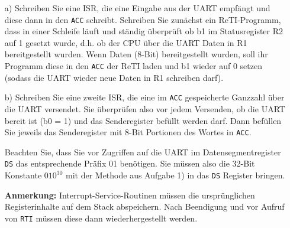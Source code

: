 \documentclass{article}
\begin{document}
\begin{itemize}
\item[a)]
Schreiben Sie eine ISR, die eine Eingabe aus der UART empfängt
und diese dann in den \texttt{ACC} schreibt.
Schreiben Sie zunächst ein ReTI-Programm, dass in einer Schleife läuft und ständig überprüft ob b1
im Statusregister R2 auf 1 gesetzt wurde, d.h. ob der CPU über die UART Daten in R1 bereitgestellt wurden.
Wenn Daten (8-Bit) bereitgestellt wurden, soll ihr Programm diese in den \texttt{ACC} der ReTI laden
und b1 wieder auf 0 setzen (sodass die UART wieder neue Daten in R1 schreiben darf).

\item[b)]
Schreiben Sie eine zweite ISR, die eine im \texttt{ACC} gespeicherte Ganzzahl über die UART versendet.
Sie überprüfen also vor jedem Versenden, ob die UART bereit ist (b0 = 1) und das Senderegister befüllt werden darf.
Dann befüllen Sie jeweils das Senderegister mit 8-Bit Portionen des Wortes in \texttt{ACC}.

Beachten Sie, dass Sie vor Zugriffen auf die UART im Datensegmentregister
\texttt{DS} das entsprechende Präfix 01 benötigen. Sie müssen also die 32-Bit Konstante 
$010^{30}$ mit der Methode aus Aufgabe 1) in das \texttt{DS} Register bringen.

\textbf{Anmerkung:} Interrupt-Service-Routinen müssen die ursprünglichen Registerinhalte
		auf dem Stack abspeichern. Nach Beendigung und vor Aufruf von \texttt{RTI} müssen
		diese dann wiederhergestellt werden.
\end{itemize}
\end{document}
